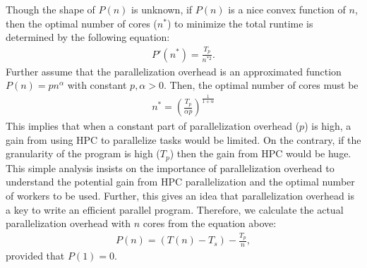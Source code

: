 \documentclass[12pt]{article}
\begin{document}
Though the shape of $P(n)$ is unknown, if $P(n)$ is a nice convex function of $n$, then the optimal number of cores ($n^*$) to minimize the total runtime is determined by the following equation: 
\begin{align*}
P'(n^*) = \frac{T_p}{n^{*2}}.
\end{align*}
Further assume that the parallelization overhead is an approximated function $P(n)=pn^\alpha$ with constant $p,\alpha>0$. Then, the optimal number of cores must be
\begin{align*}
n^* = \left(\frac{T_p}{\alpha p} \right)^{\frac{1}{1+\alpha}}
\end{align*}
This implies that when a constant part of parallelization overhead ($p$) is high, a gain from using HPC to parallelize tasks would be limited. On the contrary, if the granularity of the program is high ($T_p$) then the gain from HPC would be huge. This simple analysis insists on the importance of parallelization overhead to understand the potential gain from HPC parallelization and the optimal number of workers to be used. Further, this gives an idea that parallelization overhead is a key to write an efficient parallel program. Therefore, we calculate the actual parallelization overhead with $n$ cores from the equation above:
\begin{align*}
P(n) = (T(n)-T_s) - \frac{T_p}{n},
\end{align*}
provided that $P(1)=0$.
\end{document}
